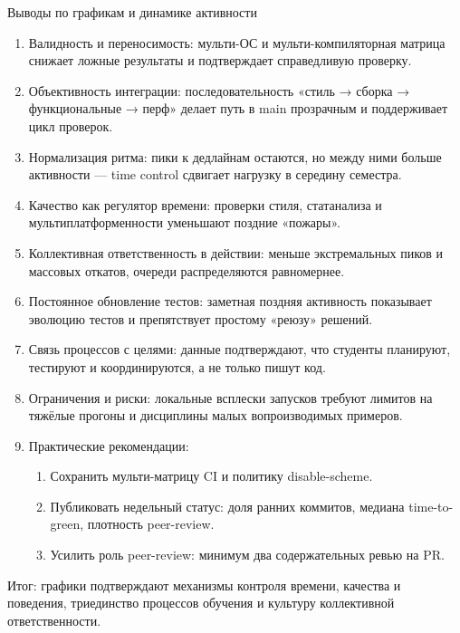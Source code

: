 \documentclass{beamer}
\begin{document}
\begin{frame}[allowframebreaks]{Выводы по графикам и динамике активности}
  \begin{enumerate}[label=\arabic*.]
    \item Валидность и переносимость: мульти-ОС и мульти-компиляторная матрица снижает ложные результаты и подтверждает справедливую проверку.
    \item Объективность интеграции: последовательность «стиль → сборка → функциональные → перф» делает путь в main прозрачным и поддерживает цикл проверок.
    \item Нормализация ритма: пики к дедлайнам остаются, но между ними больше активности — time control сдвигает нагрузку в середину семестра.
    \item Качество как регулятор времени: проверки стиля, статанализа и мультиплатформенности уменьшают поздние «пожары».
    \item Коллективная ответственность в действии: меньше экстремальных пиков и массовых откатов, очереди распределяются равномернее.
    \item Постоянное обновление тестов: заметная поздняя активность показывает эволюцию тестов и препятствует простому «реюзу» решений.
    \item Связь процессов с целями: данные подтверждают, что студенты планируют, тестируют и координируются, а не только пишут код.
    \item Ограничения и риски: локальные всплески запусков требуют лимитов на тяжёлые прогоны и дисциплины малых вопроизводимых примеров.
    \item Практические рекомендации:
      \begin{enumerate}[label=\alph*)]
        \item Сохранить мульти-матрицу CI и политику disable-scheme.
        \item Публиковать недельный статус: доля ранних коммитов, медиана time-to-green, плотность peer-review.
        \item Усилить роль peer-review: минимум два содержательных ревью на PR.
      \end{enumerate}
  \end{enumerate}
  \framebreak
  Итог: графики подтверждают механизмы контроля времени, качества и поведения, триединство процессов обучения и культуру коллективной ответственности.
\end{frame}
\end{document}
